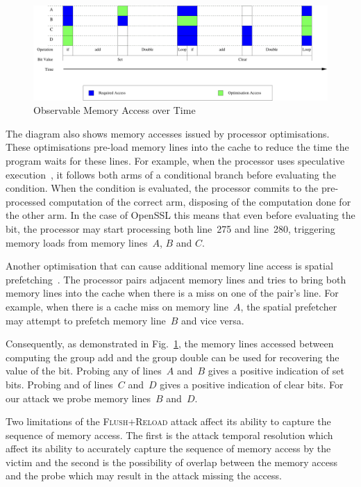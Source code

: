 \documentclass{llncs}
\begin{document}
\begin{figure}[htb]
\centering\includegraphics[width=\columnwidth]{images/temporal}
\caption{Observable Memory Access over Time\label{dgm:temporal}}
\end{figure}

The diagram also shows memory accesses issued by processor optimisations.
These optimisations pre-load memory lines into the cache to reduce the time the program waits for these lines.
For example, when the processor uses speculative execution~\cite{uht95disjoint}, it follows both arms of a conditional
branch before evaluating the condition.
When the condition is evaluated, the processor commits to the pre-processed computation of the correct arm,
disposing of the computation done for the other arm. 
In the case of OpenSSL this means that even before evaluating the bit, 
the processor may start processing both line~275 and line~280, triggering memory loads from memory lines~$A$, $B$ and $C$.

Another optimisation that can cause additional memory line access is spatial prefetching~\cite{intel12optimization}.
The processor pairs adjacent memory lines and tries to bring both memory lines into the cache
when there is a miss on one of the pair's line.
For example, when there is a cache miss on memory line~$A$, the spatial prefetcher may attempt to prefetch memory line~$B$
and vice versa.

Consequently, as demonstrated in Fig.~\ref{dgm:temporal}, the memory lines accessed between computing
the group add and the group double can be used for recovering the value of the bit.
Probing any of lines~$A$ and~$B$ gives a positive indication of set bits.  
Probing and of lines~$C$ and~$D$ gives a positive indication of clear bits.
For our attack we probe memory lines~$B$ and~$D$.

Two limitations of the \textsc{Flush+Reload} attack affect its ability to capture the sequence of memory access.
The first is the attack temporal resolution which affect its ability to accurately capture the sequence of memory access
by the victim and the second is the possibility of overlap between the memory access and the probe which may result
in the attack missing the access.
\end{document}
